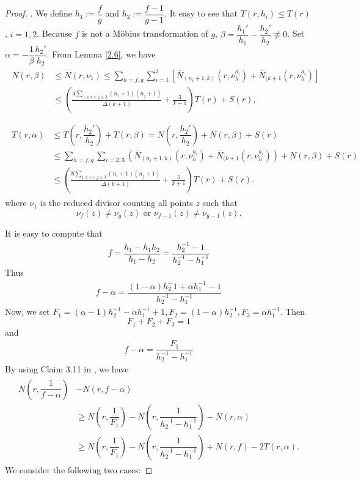 \documentclass[12pt,leqno]{amsart}
\numberwithin{equation}{section}
\begin{document}
\begin{proof}. 
We define $h_1:=\dfrac{f}{g}$ and $h_2:=\dfrac{f-1}{g-1}$. It easy to see that $T(r, h_i)\le T(r)$, $i=1,2$. Because $f$ is not a M\"{o}bius transformation of $g$, $\beta =\dfrac{h_1'}{h_1}-\dfrac{h_2'}{h_2} \not\equiv 0$. Set $\alpha=-\dfrac{1}{\beta}\dfrac{h_2'}{h_2}$. From Lemma \ref{2.6}, we have
\begin{align}\label{3.2}
\begin{split}
    N(r, \beta)&\le N(r, \nu_1)\le \sum_{h=f, g} \sum_{i=1}^{3}\left[\overline{N}_{(n_i+1,k)}(r, \nu_h^{a_i})+\overline{N}_{(k+1}(r, \nu_h^{a_i})\right]\\
    &\le \left(\frac{4\sum_{1\le i<j\le 3}(n_i+1)(n_j+1)}{\Delta(k+1)}+\frac{3}{k+1}\right)T(r)+S(r),\\
\end{split} 
\end{align} 
\begin{align}\label{3.3}\begin{split}
    T(r, \alpha)&\le T\left(r, \dfrac{h_2'}{h_2}\right)+T(r, \beta)=N\left(r, \dfrac{h_2'}{h_2}\right)+N(r, \beta)+S(r)\\
    & \le \sum_{h=f, g} \sum_{i=2,3}\left(\overline{N}_{(n_i+1,k)}(r, \nu_h^{a_i}) +\overline{N}_{(k+1}(r, \nu_h^{a_i})\right)+ N(r,\beta) +S(r)\\
    & \le \left(\frac{8\sum_{1\le i<j\le 3}(n_i+1)(n_j+1)}{\Delta(k+1)}+\frac{5}{k+1}\right)T(r) +S(r).
\end{split}\end{align}
where $\nu_1$ is the reduced divisor counting all points $z$ such that 
$$\nu_f(z)\ne \nu_g(z)\text{ or }\nu_{f-1}(z)\ne \nu_{g-1}(z).$$

It is easy to compute that
\begin{align*}
    f = \dfrac{h_1-h_1h_2}{h_1-h_2}=\dfrac{h_2^{-1}-1}{h_2^{-1}-h_1^{-1}}
\end{align*}
Thus 
\begin{align*}
    f-\alpha=\dfrac{(1-\alpha)h_2^-1+\alpha h_1^{-1}-1}{h_2^{-1}-h_1^{-1}}
\end{align*}
Now, we set $F_1=(\alpha-1)h_2^{-1}-\alpha h_1^{-1}+1, F_2=(1-\alpha)h_2^{-1}, F_3=\alpha h_1^{-1}$. Then
$$F_1+F_2+F_3=1$$
and
\begin{align*}
    f-\alpha=\dfrac{F_1}{h_2^{-1}-h_1^{-1}}
\end{align*}
By using Claim 3.11 in \cite{QK}, we have
\begin{align}\label{3.4}
\begin{split}
 N\left(r,\dfrac{1}{f-\alpha}\right)&-N(r,f-\alpha)\\
&\ge N\left(r,\dfrac{1}{F_1}\right)-N\left(r,\dfrac{1}{h_2^{-1}-h_1^{-1}}\right)-N(r,\alpha)\\
&\ge N\left(r,\dfrac{1}{F_1}\right)-N\left(r,\dfrac{1}{h_2^{-1}-h_1^{-1}}\right)+N(r,f)-2T(r,\alpha).
\end{split}
\end{align}
\noindent We consider the following two cases:


\end{proof}
\end{document}
